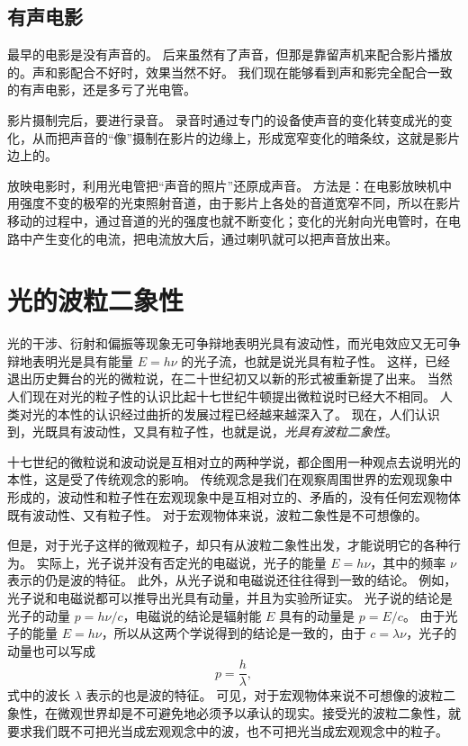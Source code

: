 \subsection{有声电影}
最早的电影是没有声音的。
后来虽然有了声音，但那是靠留声机来配合影片播放的。声和影配合不好时，效果当然不好。
我们现在能够看到声和影完全配合一致的有声电影，还是多亏了光电管。

影片摄制完后，要进行录音。
录音时通过专门的设备使声音的变化转变成光的变化，从而把声音的“像”摄制在影片的边缘上，形成宽窄变化的暗条纹，这就是影片边上的。

放映电影时，利用光电管把“声音的照片”还原成声音。
方法是：在电影放映机中用强度不变的极窄的光束照射音道，由于影片上各处的音道宽窄不同，所以在影片移动的过程中，通过音道的光的强度也就不断变化；变化的光射向光电管时，在电路中产生变化的电流，把电流放大后，通过喇叭就可以把声音放出来。

\section{光的波粒二象性}
光的干涉、衍射和偏振等现象无可争辩地表明光具有波动性，而光电效应又无可争辩地表明光是具有能量 $E=h\nu$ 的光子流，也就是说光具有粒子性。
这样，已经退出历史舞台的光的微粒说，在二十世纪初又以新的形式被重新提了出来。
当然人们现在对光的粒子性的认识比起十七世纪牛顿提出微粒说时已经大不相同。
人类对光的本性的认识经过曲折的发展过程已经越来越深入了。
现在，人们认识到，光既具有波动性，又具有粒子性，也就是说，\emph{光具有波粒二象性}。

十七世纪的微粒说和波动说是互相对立的两种学说，都企图用一种观点去说明光的本性，这是受了传统观念的影响。
传统观念是我们在观察周围世界的宏观现象中形成的，波动性和粒子性在宏观现象中是互相对立的、矛盾的，没有任何宏观物体既有波动性、又有粒子性。
对于宏观物体来说，波粒二象性是不可想像的。

但是，对于光子这样的微观粒子，却只有从波粒二象性出发，才能说明它的各种行为。
实际上，光子说并没有否定光的电磁说，光子的能量 $E=h\nu$，其中的频率 $\nu$ 表示的仍是波的特征。
此外，从光子说和电磁说还往往得到一致的结论。
例如，光子说和电磁说都可以推导出光具有动量，并且为实验所证实。
光子说的结论是光子的动量 $p=h\nu/c$，电磁说的结论是辐射能 $E$ 具有的动量是 $p=E/c$。
由于光子的能量 $E=h\nu$，所以从这两个学说得到的结论是一致的，由于 $c=\lambda\nu$，光子的动量也可以写成
\[p=\frac{h}{\lambda},\]
式中的波长 $\lambda$ 表示的也是波的特征。
可见，对于宏观物体来说不可想像的波粒二象性，在微观世界却是不可避免地必须予以承认的现实。接受光的波粒二象性，就要求我们既不可把光当成宏观观念中的波，也不可把光当成宏观观念中的粒子。

